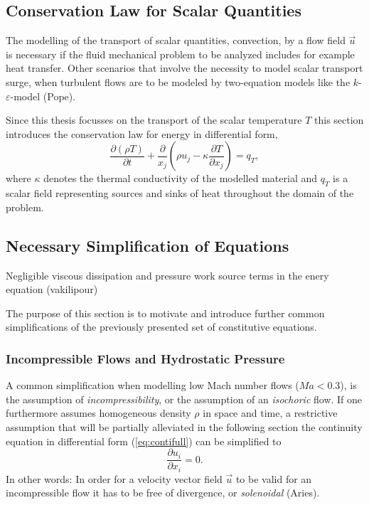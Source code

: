     \subsection{Conservation Law for Scalar Quantities}

    The modelling of the transport of scalar quantities, convection, by a flow field \(\vec{u}\) is necessary if the fluid mechanical problem to be analyzed includes for example heat transfer. Other scenarios that involve the necessity to model scalar transport surge, when turbulent flows are to be modeled by two-equation models like the \(k\)-\(\varepsilon\)-model (Pope). 
    
    Since this thesis focusses on the transport of the scalar temperature \(T\) this section introduces the conservation law for energy in differential form,
    \begin{equation}
      \frac{\partial \left(\rho T \right)}{\partial t} + \frac{\partial}{x_j} \left( \rho u_j - \kappa \frac{\partial T}{\partial x_j} \right) = q_T,
    \end{equation}
    where \(\kappa\) denotes the thermal conductivity of the modelled material and \(q_T\) is a scalar field representing sources and sinks of heat throughout the domain of the problem. 


    \subsection{Necessary Simplification of Equations}
        Negligible viscous dissipation and pressure work source terms in the enery equation (vakilipour)

        The purpose of this section is to motivate and introduce further common simplifications of the previously presented set of constitutive equations. 

      \subsubsection{Incompressible Flows and Hydrostatic Pressure}

      A common simplification when modelling low Mach number flows (\(Ma < 0.3\)), is the assumption of \textit{incompressibility}, or the assumption of an \textit{isochoric} flow. If one furthermore assumes homogeneous density \(\rho\) in space and time, a restrictive assumption that will be partially alleviated in the following section the continuity equation in differential form (\ref{eq:contifull}) can be simplified to
      \begin{equation}
        \label{eq:contiinc}
        \frac{\partial u_i}{\partial x_i} = 0.
      \end{equation}
      In other words: In order for a velocity vector field \(\vec{u}\) to be valid for an incompressible flow it has to be free of divergence, or \textit{solenoidal} (Aries).

